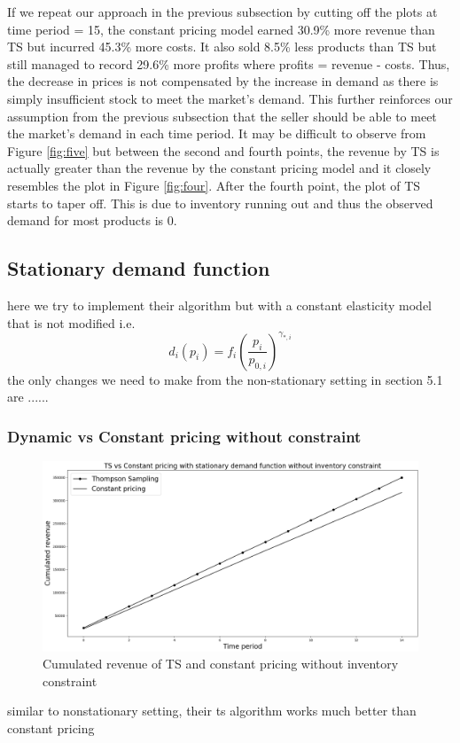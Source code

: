 \documentclass[a4paper]{article}
\begin{document}
\newline
\newline
If we repeat our approach in the previous subsection by cutting off the plots at time period = 15, the constant pricing model earned 30.9\% more revenue than TS but incurred 45.3\% more costs. It also sold 8.5\% less products than TS but still managed to record 29.6\% more profits where profits = revenue - costs. Thus, the decrease in prices is not compensated by the increase in demand as there is simply insufficient stock to meet the market's demand. This further reinforces our assumption from the previous subsection that the seller should be able to meet the market's demand in each time period. It may be difficult to observe from Figure \ref{fig:five} but between the second and fourth points, the revenue by TS is actually greater than the revenue by the constant pricing model and it closely resembles the plot in Figure \ref{fig:four}. After the fourth point, the plot of TS starts to taper off. This is due to inventory running out and thus the observed demand for most products is 0.

\subsection{Stationary demand function}
here we try to implement their algorithm but with a constant elasticity model that is not modified i.e. 
\[d_i(p_i) = f_i \left(\frac{p_i}{p_{0,i}}\right)^{\gamma_{*,i}} \]
the only changes we need to make from the non-stationary setting in section 5.1 are ......
\subsubsection{Dynamic vs Constant pricing without constraint}
\begin{figure}[h]
	\centering
	\includegraphics[width=1.03\textwidth]{1.png}
	\caption{\label{fig:1}Cumulated revenue of TS and constant pricing without inventory constraint}
\end{figure}
similar to nonstationary setting, their ts algorithm works much better than constant pricing
\end{document}
